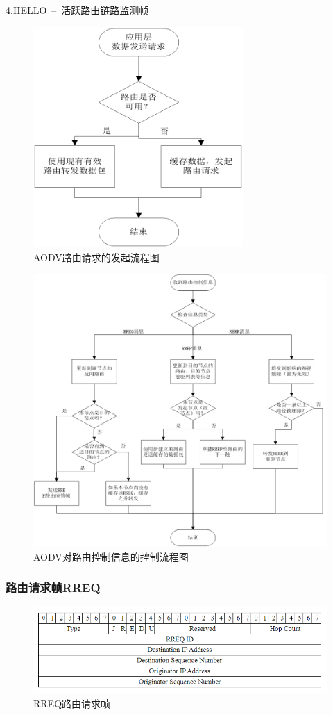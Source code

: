 \documentclass[a4paper]{article}
\begin{document}
4.HELLO\ –\ 活跃路由链路监测帧
\begin{figure}[htbp]
	\centering
	\includegraphics[width=8cm]{3.png}
	\caption{AODV路由请求的发起流程图}
\end{figure}
\begin{figure}[htbp]
	\centering
	\includegraphics[width=14cm]{4.png}
	\caption{AODV对路由控制信息的控制流程图}
\end{figure}
\newpage
\subsubsection{路由请求帧RREQ}
\begin{figure}[htbp]
	\centering
	\includegraphics[width=14cm]{5.png}
	\caption{RREQ路由请求帧}
\end{figure}
\end{document}
